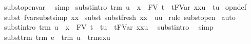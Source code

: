\begin{isabellebody}
%
\isadelimproof
%
\endisadelimproof
%
\isatagproof
{}\isamarkupfalse%
\ subst{\isacharunderscore}open{\isacharunderscore}var\ \isamarkupfalse%
\ simp%
\endisatagproof
{\isafoldproof}%
%
\isadelimproof
\isanewline
%
\endisadelimproof
\isanewline
{}\isamarkupfalse%
\ subst{\isacharunderscore}intro{\isacharcolon}\ {\isachardoublequoteopen}trm\ u\ {\isasymLongrightarrow}\ x\ {\isasymnotin}\ FV\ t\ {\isasymLongrightarrow}\ {\isacharparenleft}t{\isacharcircum}FVar\ x{\isacharparenright}{\isacharbrackleft}x{\isacharcolon}{\isacharcolon}{\isacharequal}u{\isacharbrackright}\ {\isacharequal}\ t{\isacharcircum}u{\isachardoublequoteclose}\isanewline
%
\isadelimproof
%
\endisadelimproof
%
\isatagproof
{}\isamarkupfalse%
\ opn{\isacharprime}{\isacharunderscore}def\isanewline
{}\isamarkupfalse%
\ {\isacharparenleft}subst{\isacharparenleft}{}{\isacharparenright}\ fvar{\isacharunderscore}subst{\isacharunderscore}simp{}{\isacharbrackleft}\ x{\isacharequal}x{\isacharbrackright}{\isacharparenright}\isanewline
{}\isamarkupfalse%
\ {\isacharparenleft}subst{\isacharparenleft}{}{}{\isacharparenright}\ subst{\isacharunderscore}fresh{}{\isacharbrackleft}\ x{\isacharequal}x\ \ u{\isacharequal}u{\isacharbrackright}{\isacharparenright}\isanewline
{}\isamarkupfalse%
\isanewline
{}\isamarkupfalse%
\ {\isacharparenleft}rule\ subst{\isacharunderscore}open{\isacharparenright}\isanewline
{}\isamarkupfalse%
\ auto%
\endisatagproof
{\isafoldproof}%
%
\isadelimproof
\isanewline
%
\endisadelimproof
\isanewline
{}\isamarkupfalse%
\ subst{\isacharunderscore}intro{}{\isacharcolon}\ {\isachardoublequoteopen}trm\ u\ {\isasymLongrightarrow}\ x\ {\isasymnotin}\ FV\ t\ {\isasymLongrightarrow}\ t{\isacharcircum}u\ {\isacharequal}\ {\isacharparenleft}t{\isacharcircum}FVar\ x{\isacharparenright}{\isacharbrackleft}x{\isacharcolon}{\isacharcolon}{\isacharequal}u{\isacharbrackright}{\isachardoublequoteclose}\ \isanewline
%
\isadelimproof
%
\endisadelimproof
%
\isatagproof
{}\isamarkupfalse%
\ subst{\isacharunderscore}intro\ \isamarkupfalse%
\ simp%
\endisatagproof
{\isafoldproof}%
%
\isadelimproof
\isanewline
%
\endisadelimproof
\isanewline
{}\isamarkupfalse%
\ subst{\isacharunderscore}trm{\isacharcolon}\ {\isachardoublequoteopen}trm\ e\ {\isasymLongrightarrow}\ trm\ u\ {\isasymLongrightarrow}\ trm{\isacharparenleft}e{\isacharbrackleft}x{\isacharcolon}{\isacharcolon}{\isacharequal}u{\isacharbrackright}{\isacharparenright}{\isachardoublequoteclose}\isanewline

\end{isabellebody}

